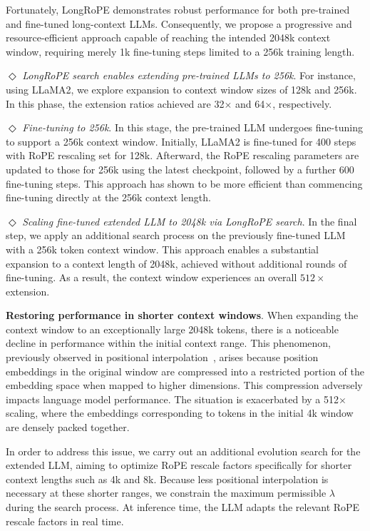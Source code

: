 Fortunately, LongRoPE demonstrates robust performance for both pre-trained and fine-tuned long-context LLMs. Consequently, we propose a progressive and resource-efficient approach capable of reaching the intended 2048k context window, requiring merely 1k fine-tuning steps limited to a 256k training length.

$\Diamond$ \textit{LongRoPE search enables extending pre-trained LLMs to 256k}. For instance, using LLaMA2, we explore expansion to context window sizes of 128k and 256k. In this phase, the extension ratios achieved are 32$\times$ and 64$\times$, respectively.

$\Diamond$ \textit{Fine-tuning to 256k}. In this stage, the pre-trained LLM undergoes fine-tuning to support a 256k context window. Initially, LLaMA2 is fine-tuned for 400 steps with RoPE rescaling set for 128k. Afterward, the RoPE rescaling parameters are updated to those for 256k using the latest checkpoint, followed by a further 600 fine-tuning steps. This approach has shown to be more efficient than commencing fine-tuning directly at the 256k context length.

$\Diamond$ \textit{Scaling fine-tuned extended LLM to 2048k via LongRoPE search}. In the final step, we apply an additional search process on the previously fine-tuned LLM with a 256k token context window. This approach enables a substantial expansion to a context length of 2048k, achieved without additional rounds of fine-tuning. As a result, the context window experiences an overall $512\times$ extension.

\textbf{Restoring performance in shorter context windows}. When expanding the context window to an exceptionally large 2048k tokens, there is a noticeable decline in performance within the initial context range. This phenomenon, previously observed in positional interpolation~\cite{pi}, arises because position embeddings in the original window are compressed into a restricted portion of the embedding space when mapped to higher dimensions. This compression adversely impacts language model performance. The situation is exacerbated by a 512$\times$ scaling, where the embeddings corresponding to tokens in the initial 4k window are densely packed together.

In order to address this issue, we carry out an additional evolution search for the extended LLM, aiming to optimize RoPE rescale factors specifically for shorter context lengths such as 4k and 8k. Because less positional interpolation is necessary at these shorter ranges, we constrain the maximum permissible $\lambda$ during the search process. At inference time, the LLM adapts the relevant RoPE rescale factors in real time.

